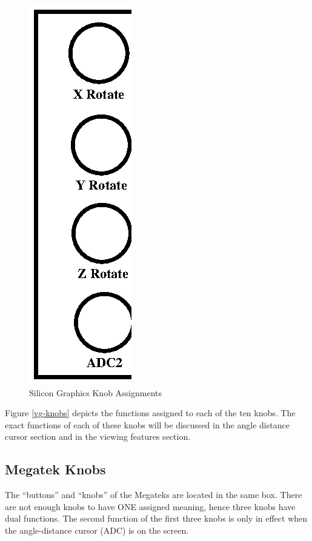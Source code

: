 \begin{figure}
\centering \includegraphics{fig-sgi-knobs.ps}
\caption{Silicon Graphics Knob Assignments}
\label{sgi-knobs}
\end{figure}

Figure \ref{vg-knobs} depicts the functions assigned to each of the ten knobs.
The exact functions of each of these knobs will be discussed in
the angle distance cursor section and in the viewing features section.

\subsection{Megatek Knobs}

The ``buttons'' and ``knobs'' of the Megateks are located in the same box.
There are not enough knobs to have ONE assigned meaning, hence
three knobs have dual functions.
The second function of the first three knobs is only in effect when
the angle-distance cursor (ADC) is on the screen.

